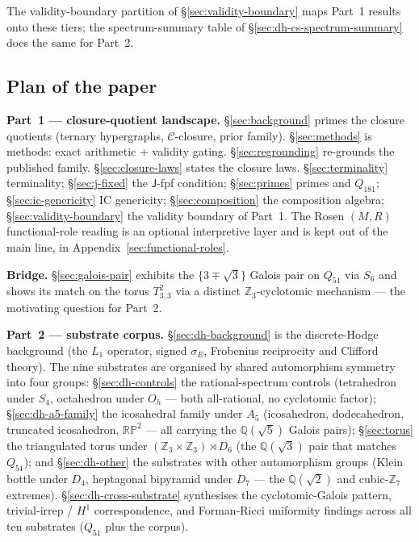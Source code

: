 \documentclass[12pt,a4paper]{article}
\theoremstyle{definition}
\theoremstyle{remark}
\newcommand{\bZ}{\mathbb{Z}}
\newcommand{\bQ}{\mathbb{Q}}                %
\newcommand{\Ccls}{\mathcal{C}}             %
\newcommand{\Jconj}{\mathsf{J}}             %
\begin{document}
The validity-boundary partition of \S\ref{sec:validity-boundary} maps
Part~1 results onto these tiers; the spectrum-summary table of
\S\ref{sec:dh-cs-spectrum-summary} does the same for Part~2.

\subsection{Plan of the paper}\label{sec:intro-plan}

\textbf{Part~1 — closure-quotient landscape.}
\S\ref{sec:background} primes the closure quotients (ternary hypergraphs,
$\Ccls$-closure, prior family).
\S\ref{sec:methods} is methods: exact arithmetic + validity gating.
\S\ref{sec:regrounding} re-grounds the published family.
\S\ref{sec:closure-laws} states the closure laws.
\S\ref{sec:terminality} terminality;
\S\ref{sec:j-fixed} the $\Jconj$-fpf condition;
\S\ref{sec:primes} primes and $Q_{181}$;
\S\ref{sec:ic-genericity} IC genericity;
\S\ref{sec:composition} the composition algebra;
\S\ref{sec:validity-boundary} the validity boundary of Part~1.
The Rosen $(M, R)$ functional-role reading is an optional interpretive
layer and is kept out of the main line, in
Appendix~\ref{sec:functional-roles}.

\textbf{Bridge.}
\S\ref{sec:galois-pair} exhibits the $\{3 \mp \sqrt 3\}$ Galois pair on
$Q_{51}$ via $S_6$ and shows its match on the torus $T^2_{3,3}$ via a
distinct $\bZ_3$-cyclotomic mechanism --- the motivating question for
Part~2.

\textbf{Part~2 — substrate corpus.}
\S\ref{sec:dh-background} is the discrete-Hodge background (the $L_1$
operator, signed $\sigma_E$, Frobenius reciprocity and Clifford theory).
The nine substrates are organised by shared automorphism symmetry into
four groups:
\S\ref{sec:dh-controls} the rational-spectrum controls (tetrahedron under
$S_4$, octahedron under $O_h$ --- both all-rational, no cyclotomic factor);
\S\ref{sec:dh-a5-family} the icosahedral family under $A_5$ (icosahedron,
dodecahedron, truncated icosahedron, $\mathbb{RP}^2$ --- all carrying the
$\bQ(\sqrt 5)$ Galois pairs);
\S\ref{sec:torus} the triangulated torus under
$(\bZ_3 \times \bZ_3) \rtimes D_6$ (the $\bQ(\sqrt 3)$ pair that matches
$Q_{51}$);
and \S\ref{sec:dh-other} the substrates with other automorphism groups
(Klein bottle under $D_4$, heptagonal bipyramid under $D_7$ --- the
$\bQ(\sqrt 2)$ and cubic-$\bZ_7$ extremes).
\S\ref{sec:dh-cross-substrate} synthesises the cyclotomic-Galois pattern,
trivial-irrep / $H^1$ correspondence, and Forman-Ricci uniformity findings
across all ten substrates ($Q_{51}$ plus the corpus).
\end{document}
